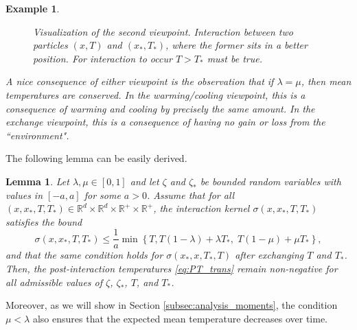 \documentclass[10pt,a4paper]{article}
\theoremstyle{theorem}
\newtheorem{lemma}{Lemma}[section]
\newtheorem{example}{Example}[section]
\numberwithin{equation}{section}
\begin{document}
\begin{example}
\begin{enumerate}[leftmargin=*, align=left]
\begin{figure}[htb]
{
}

\caption{Visualization of the second viewpoint. Interaction between two particles $(x,T)$ and $(x_*,T_*)$, where the former sits in a better position. For interaction to occur $T>T_*$ must be true.}
\label{fig:vis}
\end{figure}
\end{enumerate}
A nice consequence of either viewpoint is the observation that if $\lambda=\mu$, then mean temperatures are conserved. In the warming/cooling viewpoint, this is a consequence of warming and cooling by precisely the same amount. In the exchange viewpoint, this is a consequence of having no gain or loss from the ``environment".

\end{example}
The following lemma can be easily derived.
\begin{lemma}
Let $\lambda, \mu \in [0,1]$ and let $\zeta$ and $\zeta_*$ be bounded random variables with values in $[-a,a]$ for some $a > 0$. Assume that for all $(x,x_*,T,T_*) \in \mathbb{R}^d \times \mathbb{R}^d \times \mathbb{R}^+ \times \mathbb{R}^+$, the interaction kernel $\sigma(x,x_*,T,T_*)$ satisfies the bound
\begin{equation}
\sigma(x,x_*,T,T_*) \leq  \frac{1}{a} \min\left\{T,T(1-\lambda)+\lambda T_*, \; T(1-\mu)+\mu T_*\right\},
\label{eq:pos}
\end{equation}
and that the same condition holds for
\(\sigma(x_*,x,T_*,T)\) after exchanging \(T\) and \(T_*\).
Then, the post-interaction temperatures \eqref{eq:PT_trans}  remain non-negative for all admissible values of $\zeta$, $\zeta_*$, $T$, and $T_*$.
\end{lemma}
Moreover, as we will show in Section \ref{subsec:analysis_moments}, the condition $\mu < \lambda$ also ensures that the expected mean temperature decreases over time.
\end{document}
